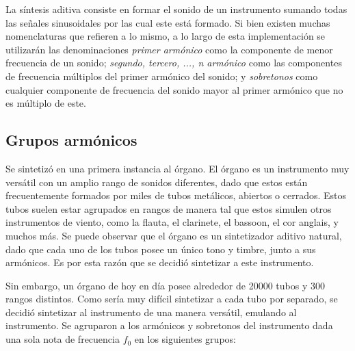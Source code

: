 



La síntesis aditiva consiste en formar el sonido de un instrumento sumando todas las señales sinusoidales por las cual este está formado. Si bien existen muchas nomenclaturas que refieren a lo mismo, a lo largo de esta implementación se utilizarán las denominaciones \textit{primer armónico} como la componente de menor frecuencia de un sonido; \textit{segundo, tercero, ..., n armónico} como las componentes de frecuencia múltiplos del primer armónico del sonido; y \textit{sobretonos} como cualquier componente de frecuencia del sonido mayor al primer armónico que no es múltiplo de este.

\subsection{Grupos armónicos}

Se sintetizó en una primera instancia al órgano. El órgano es un instrumento muy versátil con un amplio rango de sonidos diferentes, dado que estos están frecuentemente formados por miles de tubos metálicos, abiertos o cerrados. Estos tubos suelen estar agrupados en rangos de manera tal que estos simulen otros instrumentos de viento, como la flauta, el clarinete, el bassoon, el cor anglais, y muchos más. Se puede observar que el órgano es un sintetizador aditivo natural, dado que cada uno de los tubos posee un único tono y timbre, junto a sus armónicos. Es por esta razón que se decidió sintetizar a este instrumento. 

Sin embargo, un órgano de hoy en día posee alrededor de 20000 tubos y 300 rangos distintos. Como sería muy difícil sintetizar a cada tubo por separado, se decidió sintetizar al instrumento de una manera versátil, emulando al instrumento. Se agruparon a los armónicos y sobretonos del instrumento dada una sola nota de frecuencia $f_0$ en los siguientes grupos:

